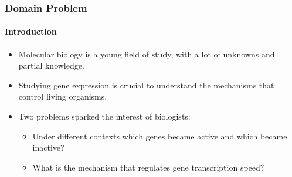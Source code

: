 \documentclass[xcolor=dvipsnames]{beamer}
\begin{document}
\begin{frame}[allowframebreaks]
  \frametitle{Domain Problem}
  \framesubtitle{Introduction}

\begin{itemize}
\item
Molecular biology is a young field of study, with a lot of unknowns and partial
knowledge.\\ \vspace{0.8cm}

\item

Studying gene expression is crucial to understand the mechanisms that control
living organisms.\\ \vspace{0.8cm}

\item
Two problems sparked the interest of biologists:

\begin{itemize}
\item
Under different contexts which genes became active  and which became inactive?

\item
What is the mechanism that regulates gene transcription speed?

\end{itemize}
\end{itemize}








\end{frame}
\end{document}
